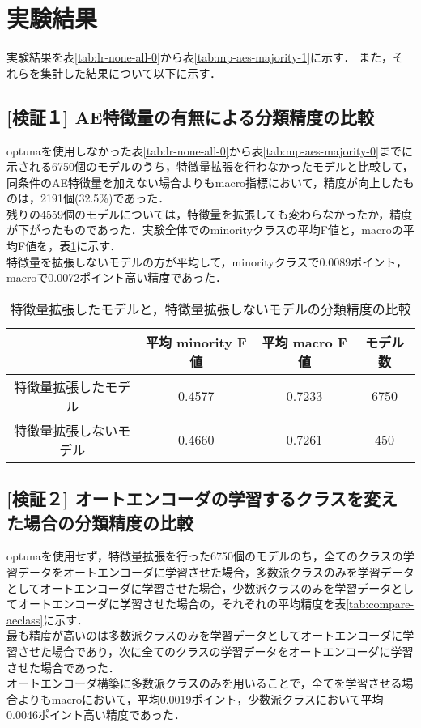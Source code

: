 \section{実験結果}
実験結果を表\ref{tab:lr-none-all-0}から表\ref{tab:mp-aes-majority-1}に示す．
また，それらを集計した結果について以下に示す．

\subsection{[検証１] AE特徴量の有無による分類精度の比較}

optunaを使用しなかった表\ref{tab:lr-none-all-0}から表\ref{tab:mp-aes-majority-0}までに示される6750個のモデルのうち，特徴量拡張を行わなかったモデルと比較して，同条件のAE特徴量を加えない場合よりもmacro指標において，精度が向上したものは，2191個(32.5\%)であった．\\
残りの4559個のモデルについては，特徴量を拡張しても変わらなかったか，精度が下がったものであった．実験全体でのminorityクラスの平均F値と，macroの平均F値を，表\ref{tab:compare-avg-f1}に示す．\\
特徴量を拡張しないモデルの方が平均して，minorityクラスで0.0089ポイント，macroで0.0072ポイント高い精度であった．\\



\begin{table}[htbp]
\caption{特徴量拡張したモデルと，特徴量拡張しないモデルの分類精度の比較}
\label{tab:compare-avg-f1}
\centering
\begin{tabular}{cccc}
    \hline
    & 平均 minority F値 & 平均 macro F値 & モデル数  \\ 
    \hline
    特徴量拡張したモデル  & 0.4577& 0.7233& 6750 \\ 
    特徴量拡張しないモデル & 0.4660& 0.7261& 450  \\ 
    \hline
\end{tabular}
\end{table}

\subsection{[検証２] オートエンコーダの学習するクラスを変えた場合の分類精度の比較}
optunaを使用せず，特徴量拡張を行った6750個のモデルのち，全てのクラスの学習データをオートエンコーダに学習させた場合，多数派クラスのみを学習データとしてオートエンコーダに学習させた場合，少数派クラスのみを学習データとしてオートエンコーダに学習させた場合の，それぞれの平均精度を表\ref{tab:compare-aeclass}に示す．\\
最も精度が高いのは多数派クラスのみを学習データとしてオートエンコーダに学習させた場合であり，次に全てのクラスの学習データをオートエンコーダに学習させた場合であった．\\
オートエンコーダ構築に多数派クラスのみを用いることで，全てを学習させる場合よりもmacroにおいて，平均0.0019ポイント，少数派クラスにおいて平均0.0046ポイント高い精度であった．\\

